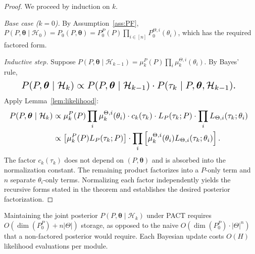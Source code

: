 \begin{proof}
We proceed by induction on $k$.

\textit{Base case ($k=0$).} By Assumption~\ref{ass:PF}, $P(P, \boldsymbol{\theta} \mid \mathcal{H}_0) = P_0(P, \boldsymbol{\theta}) = P_0^P(P) \prod_{i \in [n]} P_0^{\Theta,i}(\theta_i)$, which has the required factored form.

\textit{Inductive step.} Suppose $P(P, \boldsymbol{\theta} \mid \mathcal{H}_{k-1}) = \mu_k^P(P) \prod_{i} \mu_k^{\Theta,i}(\theta_i)$. By Bayes' rule,
\begin{equation}\resizebox{0.9\linewidth}{!}{$\displaystyle P(P, \boldsymbol{\theta} \mid \mathcal{H}_k) \propto P(P, \boldsymbol{\theta} \mid \mathcal{H}_{k-1}) \cdot P(\tau_k \mid P, \boldsymbol{\theta}, \mathcal{H}_{k-1}). $}\end{equation}
Apply Lemma~\ref{lem:likelihood}:
\[\resizebox{\linewidth}{!}{$\displaystyle\begin{aligned}
P(P, \boldsymbol{\theta} \mid \mathcal{H}_k) &\propto \mu_k^P(P) \prod_{i} \mu_k^{\Theta,i}(\theta_i) \cdot c_k(\tau_k) \cdot L_P(\tau_k; P) \cdot \prod_{i} L_{\Theta,i}(\tau_k; \theta_i) \\
&\propto \left[\mu_k^P(P) L_P(\tau_k; P)\right] \cdot \prod_{i} \left[\mu_k^{\Theta,i}(\theta_i) L_{\Theta,i}(\tau_k; \theta_i)\right].
\end{aligned}$}\]
The factor $c_k(\tau_k)$ does not depend on $(P, \boldsymbol{\theta})$ and is absorbed into the normalization constant. The remaining product factorizes into a $P$-only term and $n$ separate $\theta_i$-only terms. Normalizing each factor independently yields the recursive forms stated in the theorem and establishes the desired posterior factorization.
\end{proof}

\begin{corollary}
\label{cor:storage}
Maintaining the joint posterior $P(P, \boldsymbol{\theta} \mid \mathcal{H}_k)$ under PACT requires $O\left(\dim(P_0^P) + n |\Theta|\right)$ storage, as opposed to the naive $O\left(\dim(P_0^P) \cdot |\Theta|^n\right)$ that a non-factored posterior would require. Each Bayesian update costs $O(H)$ likelihood evaluations per module.
\end{corollary}

